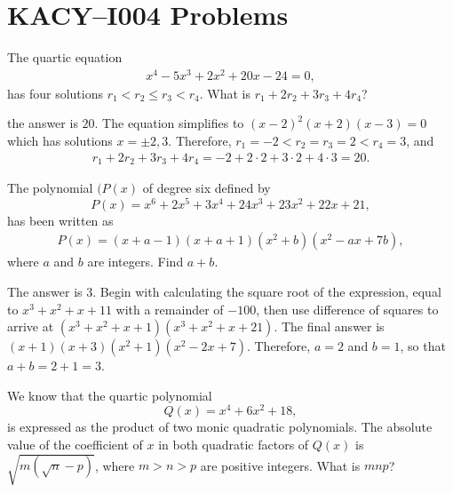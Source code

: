 \documentclass[12pt,a4paper]{memoir}
\theoremstyle{definition}
\begin{document}
	\newpage
	
	\section*{KACY--I004 Problems}
	
	\setcounter{question}{4}
	
	
	\begin{question}
		The quartic equation
		\begin{align*}
		x^4-5x^3+2x^2+20x-24=0,
		\end{align*}
		has four solutions $r_1<  r_2 \leq r_3 < r_4$. What is $r_1+2r_2+3r_3+4r_4$?
	\end{question}
	
	\begin{solution}
		the answer is $20$. The equation simplifies to $(x-2)^2(x+2)(x-3)=0$ which has solutions $x=\pm 2, 3$. Therefore, $r_1=-2< r_2=r_3=2 < r_4=3$, and
		\begin{align*}
			r_1+2r_2+3r_3+4r_4 = -2 + 2 \cdot 2 + 3 \cdot 2 + 4 \cdot 3 = \boxed{20}.
		\end{align*}
	\end{solution}
	
	
	\setcounter{question}{42}
	
	\begin{tcolorbox}
		\begin{question}
			The polynomial $(P(x)$ of degree six defined by $$P(x) = x^6+2x^5+3x^4+24x^3+23x^2+22x+21,$$
			has been written as 
			\begin{align*}
				P(x)=(x+a-1)(x+a+1)(x^2+b)(x^2-ax+7b),
			\end{align*}
			where $a$ and $b$ are integers. Find $a+b$.
		\end{question}
	\end{tcolorbox}
	
	\begin{solution}%
		The answer is $3$. Begin with calculating the square root of the expression, equal to $x^3+x^2+x+11$ with a remainder of $-100$, then use difference of squares to arrive at $(x^3+x^2+x+1)(x^3+x^2+x+21)$. The final answer is $(x+1)(x+3)(x^2+1)(x^2-2x+7)$. Therefore, $a=2$ and $b=1$, so that $a+b=2+1=\boxed{3}$.
	\end{solution}
	
	\begin{tcolorbox}
		\SetupExSheets{headings=runin}
		\begin{question}
			We know that the quartic polynomial $$Q(x)=x^4+6x^2+18,$$ is expressed as the product of two monic quadratic polynomials. The absolute value of the coefficient of $x$ in both quadratic factors of $Q(x)$ is $\sqrt{m(\sqrt{n}-p)}$, where $m>n>p$ are positive integers. What is $mnp$?
		\end{question}
	\end{tcolorbox}
	
\end{document}
